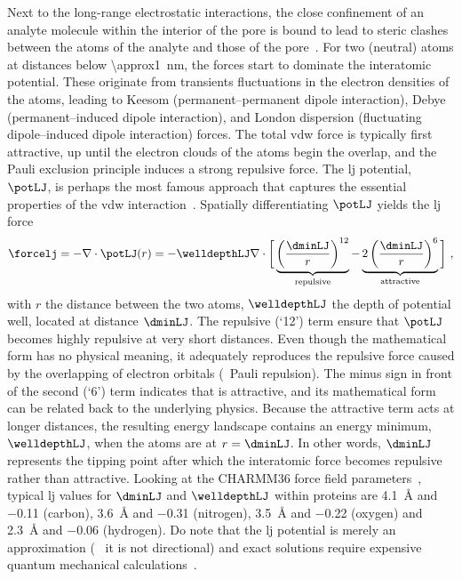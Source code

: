 Next to the long-range electrostatic interactions, the close confinement of an analyte molecule within the
interior of the pore is bound to lead to steric clashes between the atoms of the analyte and those of the
pore~\cite{Buchsbaum-2013}. For two (neutral) atoms at distances below \SI{\approx1}{\nm}, the 
forces start to dominate the interatomic potential. These originate from transients fluctuations in the
electron densities of the atoms, leading to Keesom (permanent--permanent dipole interaction), Debye
(permanent--induced dipole interaction), and London dispersion (fluctuating dipole--induced dipole
interaction) forces. The total \gls{vdw} force is typically first attractive, up until the electron clouds of
the atoms begin the overlap, and the Pauli exclusion principle induces a strong repulsive force. The \gls{lj}
potential, $\potLJ$, is perhaps the most famous approach that captures the essential properties of the
\gls{vdw} interaction~\cite{Paquet-2015}. Spatially differentiating $\potLJ$ yields the \gls{lj} force 
%
\begin{equation}\label{eq:nanopores_LJ_force}
  \forcelj = - \nabla \cdot \potLJ( r ) = - \welldepthLJ \nabla \cdot \bigg[ 
    \underbrace{ \left( \dfrac{ \dminLJ }{ r } \right)^{12} }_{\text{repulsive}}
    -
    \underbrace{ 2 \left( \dfrac{ \dminLJ }{ r } \right)^{6} }_{\text{attractive}}
  \bigg]
  \text{ ,}
\end{equation}
% 
with $r$ the distance between the two atoms, $\welldepthLJ$ the depth of potential well, located at distance
$\dminLJ$. The repulsive (`12') term ensure that $\potLJ$ becomes highly repulsive at very short distances.
Even though the mathematical form has no physical meaning, it adequately reproduces the repulsive force caused
by the overlapping of electron orbitals (\ie~Pauli repulsion). The minus sign in front of the second (`6')
term indicates that is attractive, and its mathematical form can be related back to the underlying physics.
Because the attractive term acts at longer distances, the resulting energy landscape contains an energy
minimum, $\welldepthLJ$, when the atoms are at $r = \dminLJ$. In other words, $\dminLJ$ represents the tipping
point after which the interatomic force becomes repulsive rather than attractive. Looking at the {CHARMM36}
force field parameters~\cite{Huang-2016}, typical \gls{lj} values for $\dminLJ$ and $\welldepthLJ$ within
proteins are \SI{4.1}{\angstrom} and \SI{-0.11}{\kbt} (carbon), \SI{3.6}{\angstrom} and \SI{-0.31}{\kbt}
(nitrogen), \SI{3.5}{\angstrom} and \SI{-0.22}{\kbt} (oxygen) and \SI{2.3}{\angstrom} and \SI{-0.06}{\kbt}
(hydrogen). Do note that the \gls{lj} potential is merely an approximation (\eg~ it is not directional) and
exact solutions require expensive quantum mechanical calculations~\cite{Paquet-2015}.

